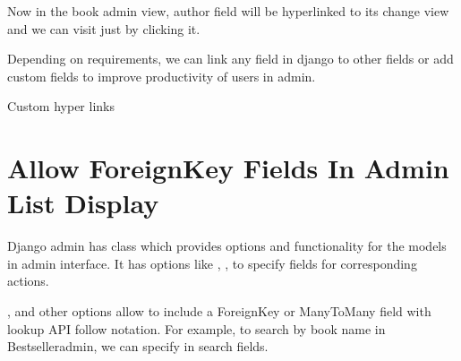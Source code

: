 \documentclass[letterpaper,12pt,english]{sphinxmanual}
\begin{document}
Now in the book admin view, author field will be hyperlinked to its change view and we can visit just by clicking it.

Depending on requirements, we can link any field in django to other fields or add custom fields to improve productivity of users in admin.

Custom hyper links



\chapter{Allow ForeignKey Fields In Admin List Display}
\label{\detokenize{admin_list_display_foreignkey:allow-foreignkey-fields-in-admin-list-display}}\label{\detokenize{admin_list_display_foreignkey::doc}}
Django admin has  class which provides options and functionality for the models in admin interface. It has options like , ,  to specify fields for corresponding actions.

,  and other options allow to include a ForeignKey or ManyToMany field with lookup API follow notation. For example, to search by book name in Bestselleradmin, we can specify  in search fields.

\begin{sphinxVerbatim}[commandchars=\\\{\}]
   

   


 
       
         


 
\end{sphinxVerbatim}
\end{document}
